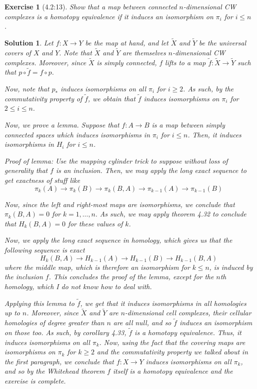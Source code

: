 \documentclass{article}
\theoremstyle{plain}
\newtheorem*{ex}{Exercise}
\theoremstyle{nonumberplain}
\newtheorem{sol}{Solution}
\begin{document}
\begin{ex}[4.2:13]
Show that a map between connected $n$-dimensional CW complexes is a homotopy equivalence if it induces an isomorphism on $\pi_i$ for $i \leq n$.
\end{ex}

\begin{sol}
Let $f \colon X \to Y$ be the map at hand, and let $\tilde X$ and $\tilde Y$ be the universal covers of $X$ and $Y$. Note that $\tilde X$ and $\tilde Y$ are themselves $n$-dimensional CW complexes. Moreover, since $\tilde X$ is simply connected, $f$ lifts to a map $\tilde f \colon \tilde X \to \tilde Y$ such that $p \circ \tilde f = f \circ p$.

Now, note that $p_*$ induces isomorphisms on all $\pi_i$ for $i \geq 2$. As such, by the commutativity property of $\tilde f$, we obtain that $\tilde f$ induces isomorphisms on $\pi_i$ for $2 \leq i \leq n$.

Now, we prove a lemma. Suppose that $f \colon A \to B$ is a map between simply connected spaces which induces isomorphisms in $\pi_i$ for $i \leq n$. Then, it induces isomorphisms in $H_i$ for $i \leq n$.

Proof of lemma: Use the mapping cylinder trick to suppose without loss of generality that $f$ is an inclusion. Then, we may apply the long exact sequence to get exactness of stuff like
\begin{equation}
\pi_k(A) \to \pi_k(B) \to \pi_k(B,A) \to \pi_{k-1}(A) \to \pi_{k-1}(B)
\end{equation}

Now, since the left and right-most maps are isomorphisms, we conclude that $\pi_k(B,A) = 0$ for $k = 1, \dots, n$. As such, we may apply theorem 4.32 to conclude that $H_k(B,A) = 0$ for these values of $k$.

Now, we apply the long exact sequence in homology, which gives us that the following sequence is exact
\begin{equation}
H_k(B,A) \to H_{k-1}(A) \to H_{k-1}(B) \to H_{k-1}(B,A)
\end{equation}
where the middle map, which is therefore an isomorphism for $k \leq n$, is induced by the inclusion $f$. This concludes the proof of the lemma, except for the $n$th homology, which I do not know how to deal with.

Applying this lemma to $\tilde f$, we get that it induces isomorphisms in all homologies up to $n$. Moreover, since $\tilde X$ and $\tilde Y$ are $n$-dimensional cell complexes, their cellular homologies of degree greater than $n$ are all null, and so $\tilde f$ induces an isomorphism on those too. As such, by corollary 4.33, $\tilde f$ is a homotopy equivalence. Thus, it induces isomorphisms on all $\pi_k$. Now, using the fact that the covering maps are isomorphisms on $\pi_k$ for $k \geq 2$ and the commutativity property we talked about in the first paragraph, we conclude that $f \colon X \to Y$ induces isomorphisms on all $\pi_k$, and so by the Whitehead theorem $f$ itself is a homotopy equivalence and the exercise is complete.

\end{sol}
\end{document}
